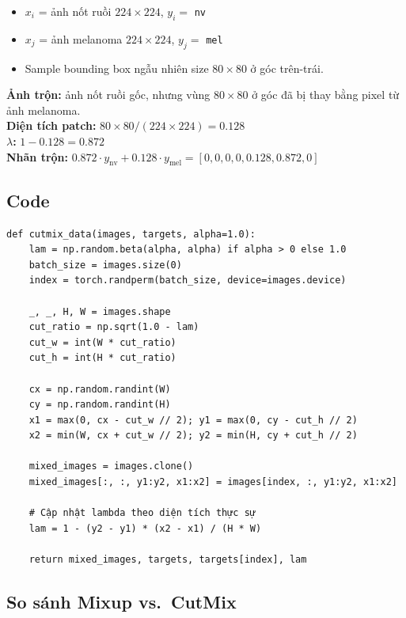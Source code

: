 \documentclass[11pt,a4paper]{article}
\begin{document}
\begin{example}
\begin{itemize}[leftmargin=*]
  \item $x_i$ = ảnh nốt ruồi $224 \times 224$, $y_i = $ \texttt{nv}
  \item $x_j$ = ảnh melanoma $224 \times 224$, $y_j = $ \texttt{mel}
  \item Sample bounding box ngẫu nhiên size $80 \times 80$ ở góc trên-trái.
\end{itemize}
\textbf{Ảnh trộn:} ảnh nốt ruồi gốc, nhưng vùng $80 \times 80$ ở góc đã bị thay bằng pixel từ ảnh melanoma.\\
\textbf{Diện tích patch:} $80 \times 80 / (224 \times 224) = 0.128$\\
\textbf{$\lambda$:} $1 - 0.128 = 0.872$\\
\textbf{Nhãn trộn:} $0.872 \cdot y_{\text{nv}} + 0.128 \cdot y_{\text{mel}} = [0,0,0,0,\mathbf{0.128},\mathbf{0.872},0]$
\end{example}

\subsection{Code}

\begin{lstlisting}[caption={\texttt{src/data/mixup.py} --- hàm \texttt{cutmix\_data}}]
def cutmix_data(images, targets, alpha=1.0):
    lam = np.random.beta(alpha, alpha) if alpha > 0 else 1.0
    batch_size = images.size(0)
    index = torch.randperm(batch_size, device=images.device)

    _, _, H, W = images.shape
    cut_ratio = np.sqrt(1.0 - lam)
    cut_w = int(W * cut_ratio)
    cut_h = int(H * cut_ratio)

    cx = np.random.randint(W)
    cy = np.random.randint(H)
    x1 = max(0, cx - cut_w // 2); y1 = max(0, cy - cut_h // 2)
    x2 = min(W, cx + cut_w // 2); y2 = min(H, cy + cut_h // 2)

    mixed_images = images.clone()
    mixed_images[:, :, y1:y2, x1:x2] = images[index, :, y1:y2, x1:x2]

    # Cập nhật lambda theo diện tích thực sự
    lam = 1 - (y2 - y1) * (x2 - x1) / (H * W)

    return mixed_images, targets, targets[index], lam
\end{lstlisting}

\subsection{So sánh Mixup vs.\ CutMix}
\end{document}
